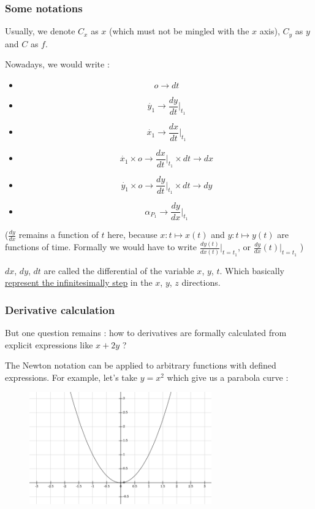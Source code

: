 \documentclass[12pt]{article}
\begin{document}
\subsubsection{Some notations}

Usually, we denote $C_x$ as $x$ (which must not be mingled with the $x$ axis), $C_y$ as $y$ and $C$ as $f$.

\bigskip

Nowadays, we would write :

\begin{itemize}
\item $$ o \rightarrow dt $$
\item $$ \dot{y_1} \rightarrow \frac{dy}{dt}|_{t_1} $$
\item $$ \dot{x_1} \rightarrow \frac{dx}{dt}|_{t_1} $$
\item $$ \dot{x_1} \times o \rightarrow \frac{dx}{dt}|_{t_1} \times dt  \rightarrow dx $$
\item $$ \dot{y_1} \times o \rightarrow \frac{dy}{dt}|_{t_1} \times dt  \rightarrow dy $$
\item $$ \alpha_{P_1} \rightarrow \frac{dy}{dx}|_{t_1} $$ 
\end{itemize}

($\frac{dy}{dx}$ remains a function of $t$ here, because $x: t \mapsto x(t)$ and $y: t \mapsto y(t)$ are functions of time. Formally we would have to write $\frac{dy(t)}{dx(t)}|_{t=t_1}$, or $\frac{dy}{dx}(t)|_{t=t_1}$ )

$dx$, $dy$, $dt$ are called the differential of the variable $x$, $y$, $t$. Which basically  \href{https://math.stackexchange.com/questions/200393/what-is-dx-in-integration}{represent the infinitesimally step} in the $x$, $y$, $z$ directions. 


\subsubsection{Derivative calculation}


But one question remains : how to derivatives are formally calculated from explicit expressions like $x + 2y$ ?

The Newton notation can be applied to arbitrary functions with defined expressions. For example, let's take $y = x^2$ which give us a parabola curve :

\begin{figure}[H]
\centering
\includegraphics[width=0.7\textwidth]{assets/images/SHTIxCkjCR.png}
\end{figure}
\end{document}
